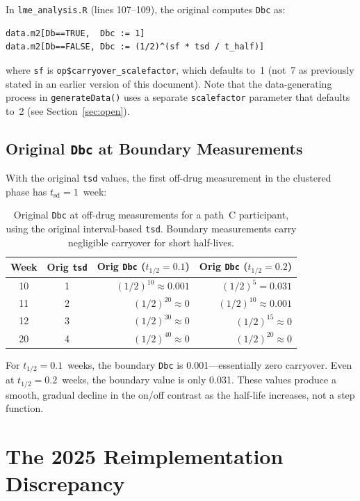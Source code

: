 \documentclass[11pt]{article}
\begin{document}
In \texttt{lme\_analysis.R} (lines 107--109), the original computes
\texttt{Dbc} as:

\begin{verbatim}
data.m2[Db==TRUE,  Dbc := 1]
data.m2[Db==FALSE, Dbc := (1/2)^(sf * tsd / t_half)]
\end{verbatim}

\noindent where \texttt{sf} is
\texttt{op\$carryover\_scalefactor}, which defaults to~1 (not~7 as
previously stated in an earlier version of this document). Note that
the data-generating process in \texttt{generateData()} uses a separate
\texttt{scalefactor} parameter that defaults to~2 (see
Section~\ref{sec:open}).

\subsection{Original \texttt{Dbc} at Boundary Measurements}

With the original \texttt{tsd} values, the first off-drug measurement
in the clustered phase has $t_{\text{sd}} = 1$~week:

\begin{table}[h]
\centering
\caption{Original \texttt{Dbc} at off-drug measurements for a path~C
  participant, using the original interval-based \texttt{tsd}.
  Boundary measurements carry negligible carryover for short
  half-lives.}
\label{tab:orig_dbc}
\begin{tabular}{@{}ccrr@{}}
\toprule
Week & Orig \texttt{tsd}
  & Orig \texttt{Dbc} ($t_{1/2} = 0.1$)
  & Orig \texttt{Dbc} ($t_{1/2} = 0.2$) \\
\midrule
10 & 1 & $(1/2)^{10} \approx 0.001$ & $(1/2)^{5} = 0.031$ \\
11 & 2 & $(1/2)^{20} \approx 0$ & $(1/2)^{10} \approx 0.001$ \\
12 & 3 & $(1/2)^{30} \approx 0$ & $(1/2)^{15} \approx 0$ \\
20 & 4 & $(1/2)^{40} \approx 0$ & $(1/2)^{20} \approx 0$ \\
\bottomrule
\end{tabular}
\end{table}

\noindent For $t_{1/2} = 0.1$~weeks, the boundary \texttt{Dbc} is
0.001---essentially zero carryover. Even at $t_{1/2} = 0.2$~weeks,
the boundary value is only 0.031. These values produce a smooth,
gradual decline in the on/off contrast as the half-life increases,
not a step function.

\section{The 2025 Reimplementation Discrepancy}
\label{sec:bug}
\end{document}
